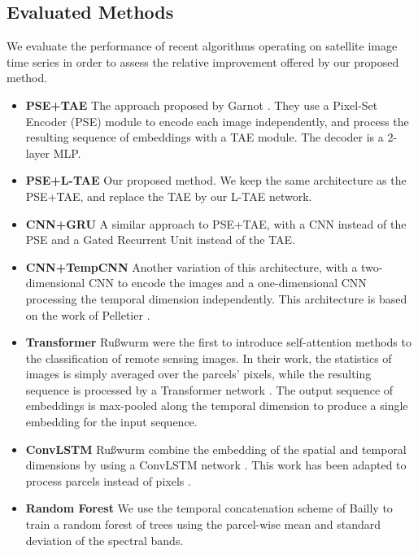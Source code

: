 \documentclass[runningheads]{llncs}
\begin{document}
\subsection{Evaluated Methods}
We evaluate the performance of recent algorithms operating on satellite image time series in order to assess the relative improvement offered by our proposed method.
\begin{itemize}
    \item\textbf{PSE+TAE} 
    The approach proposed by Garnot \etal \cite{garnot2019satellite}. They use a Pixel-Set Encoder (PSE) module to encode each image independently, and process the resulting sequence of embeddings with a TAE module. The decoder  is a 2-layer MLP.
    \item\textbf{PSE+L-TAE} Our proposed method. We keep the same architecture as the PSE+TAE, and replace the TAE by our L-TAE network.
    \item\textbf{CNN+GRU} 
    A similar approach \cite{garnot2019time} to {PSE+TAE}, with a CNN instead of the PSE and a Gated Recurrent Unit \cite{chung2014GRU} instead of the TAE.
    \item\textbf{CNN+TempCNN} 
    Another variation of this architecture, with a two-dimensional CNN to encode the images and a one-dimensional CNN processing the temporal dimension independently.
    This architecture is based on the work of Pelletier \etal \cite{pelletier2019temporal}.
    \item\textbf{Transformer}
    Ru{\ss}wurm \etal were the first to introduce self-attention methods to the classification of remote sensing images. In their work\cite{russwurm2019self}, the statistics of images is simply averaged over the parcels' pixels, while the resulting sequence is processed by a Transformer network \cite{vaswani2017attention}. The output sequence of embeddings is max-pooled along the temporal dimension to produce a single embedding for the input sequence.
    \item\textbf{ConvLSTM} 
    Ru{\ss}wurm \etal \cite{russwurm2018convolutional} combine the embedding of the spatial and temporal dimensions by using a ConvLSTM network \cite{xingjian2015convolutional}. This work has been adapted to process parcels instead of pixels \cite{garnot2019satellite}.
    \item\textbf{Random Forest}
    We use the temporal concatenation scheme of Bailly \etal to train a random forest of  trees using the parcel-wise mean and standard deviation of the spectral bands. 
\end{itemize}
\end{document}
